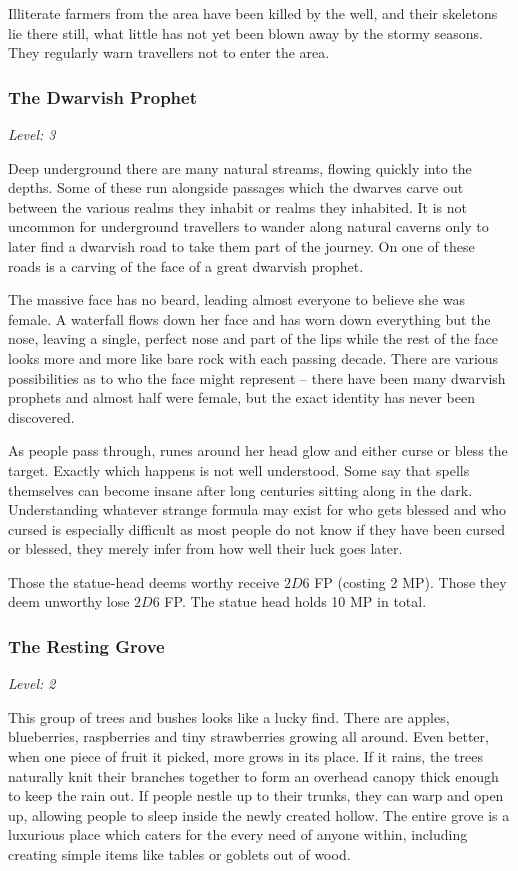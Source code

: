Illiterate farmers from the area have been killed by the well, and their skeletons lie there still, what little has not yet been blown away by the stormy seasons.  They regularly warn travellers not to enter the area.

\subsubsection{The Dwarvish Prophet}

\textit{Level: 3}

Deep underground there are many natural streams, flowing quickly into the depths.  Some of these run alongside passages which the dwarves carve out between the various realms they inhabit or realms they inhabited.  It is not uncommon for underground travellers to wander along natural caverns only to later find a dwarvish road to take them part of the journey.  On one of these roads is a carving of the face of a great dwarvish prophet.

The massive face has no beard, leading almost everyone to believe she was female.  A waterfall flows down her face and has worn down everything but the nose, leaving a single, perfect nose and part of the lips while the rest of the face looks more and more like bare rock with each passing decade.  There are various possibilities as to who the face might represent -- there have been many dwarvish prophets and almost half were female, but the exact identity has never been discovered.

As people pass through, runes around her head glow and either curse or bless the target.  Exactly which happens is not well understood.  Some say that spells themselves can become insane after long centuries sitting along in the dark.  Understanding whatever strange formula may exist for who gets blessed and who cursed is especially difficult as most people do not know if they have been cursed or blessed, they merely infer from how well their luck goes later.

Those the statue-head deems worthy receive $2D6$ FP (costing 2 MP).  Those they deem unworthy lose $2D6$ FP.  The statue head holds 10 MP in total.

\subsubsection{The Resting Grove}

\textit{Level: 2}

This group of trees and bushes looks like a lucky find.  There are apples, blueberries, raspberries and tiny strawberries growing all around.  Even better, when one piece of fruit it picked, more grows in its place.  If it rains, the trees naturally knit their branches together  to form an overhead canopy thick enough to keep the rain out.  If people nestle up to their trunks, they can warp and open up, allowing people to sleep inside the newly created hollow.  The entire grove is a luxurious place which caters for the every need of anyone within, including creating simple items like tables or goblets out of wood.

